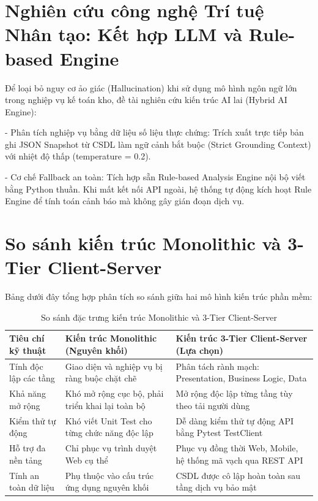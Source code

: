 \section{Nghiên cứu công nghệ Trí tuệ Nhân tạo: Kết hợp LLM và Rule-based Engine}

Để loại bỏ nguy cơ ảo giác (Hallucination) khi sử dụng mô hình ngôn ngữ lớn trong nghiệp vụ kế toán kho, đề tài nghiên cứu kiến trúc AI lai (Hybrid AI Engine):

- Phân tích nghiệp vụ bằng dữ liệu số liệu thực chứng: Trích xuất trực tiếp bản ghi JSON Snapshot từ CSDL làm ngữ cảnh bắt buộc (Strict Grounding Context) với nhiệt độ thấp (temperature = 0.2).

- Cơ chế Fallback an toàn: Tích hợp sẵn Rule-based Analysis Engine nội bộ viết bằng Python thuần. Khi mất kết nối API ngoài, hệ thống tự động kích hoạt Rule Engine để tính toán cảnh báo mà không gây gián đoạn dịch vụ.

\section{So sánh kiến trúc Monolithic và 3-Tier Client-Server}

Bảng dưới đây tổng hợp phân tích so sánh giữa hai mô hình kiến trúc phần mềm:

\begin{table}[h!]
\centering
\caption{So sánh đặc trưng kiến trúc Monolithic và 3-Tier Client-Server}
\begin{tabular}{|l|l|l|}
\hline
\rowcolor{tablehead}
\textbf{Tiêu chí kỹ thuật} & \textbf{Kiến trúc Monolithic (Nguyên khối)} & \textbf{Kiến trúc 3-Tier Client-Server (Lựa chọn)} \\ \hline
Tính độc lập các tầng & Giao diện và nghiệp vụ bị ràng buộc chặt chẽ & Phân tách rành mạch: Presentation, Business Logic, Data \\ \hline
Khả năng mở rộng & Khó mở rộng cục bộ, phải triển khai lại toàn bộ & Mở rộng độc lập từng tầng tùy theo tải người dùng \\ \hline
Kiểm thử tự động & Khó viết Unit Test cho từng chức năng độc lập & Dễ dàng kiểm thử tự động API bằng Pytest TestClient \\ \hline
Hỗ trợ đa nền tảng & Chỉ phục vụ trình duyệt Web cụ thể & Phục vụ đồng thời Web, Mobile, hệ thống mã vạch qua REST API \\ \hline
Tính an toàn dữ liệu & Phụ thuộc vào cấu trúc ứng dụng nguyên khối & CSDL được cô lập hoàn toàn sau tầng dịch vụ bảo mật \\ \hline
\end{tabular}
\end{table}

